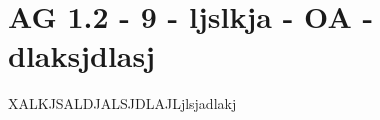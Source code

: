 \section{AG 1.2 - 9 - ljslkja - OA - dlaksjdlasj}

\begin{beispiel}[AG 1.2]{1}
XALKJSALDJALSJDLAJLjlsjadlakj
\end{beispiel}